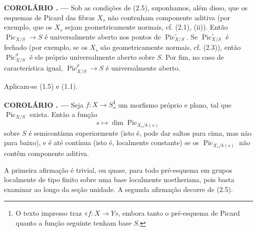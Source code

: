 \documentclass[11pt,twoside,openany]{book}
\numberwithin{equation}{section}
\newcommand{\src}[1]{%
  \phantomsection\hypertarget{src:#1}{}%
  \marginpar{\raggedleft\footnotesize\sffamily #1}%
}
\theoremstyle{plain}
\theoremstyle{definition}
\theoremstyle{remark}
\newcommand{\result}[2]{%
  \par\medskip\noindent\textbf{#1%
  \if\relax\detokenize{#2}\relax\else\space#2\fi. ---}\enspace
}
\newcommand{\FgaUnitKey}{frontmatter}
\renewcommand{\src}[1]{%
  \phantomsection\hypertarget{src:\FgaUnitKey:#1}{}%
  \marginpar{\raggedleft\footnotesize\sffamily #1}%
}
\begin{document}
\result{COROLÁRIO}{} Sob as condições de (2.5), suponhamos, além disso, que os
esquemas de Picard das fibras $X_s$ não contenham componente aditiva (por
exemplo, que os $X_s$ sejam geometricamente normais, cf. (2.1), (ii)). Então
$\operatorname{Pic}_{X/S}\longrightarrow S$ é universalmente aberto nos pontos
de $\operatorname{Pic}_{X/S}^\circ$. Se
$\operatorname{Pic}_{X/S}^\circ$ é fechado (por exemplo, se os $X_s$ são
geometricamente normais, cf. (2.3)), então
$\operatorname{Pic}_{X/S}^\sigma$ é ele próprio universalmente aberto sobre
$S$. Por fim, no caso de característica igual,
$\operatorname{Pic}_{X/S}^\rho\longrightarrow S$ é universalmente aberto.

Aplicam-se (1.5) e (1.1).
\src{234}
\result{COROLÁRIO}{2.7} Seja $f:X\longrightarrow S$\footnote{O texto impresso
traz «$f:X\longrightarrow Y$», embora tanto o pré-esquema de Picard quanto a
função seguinte tenham base $S$.} um morfismo próprio e plano, tal que
$\operatorname{Pic}_{X/S}$ exista. Então a função
\[
s\longmapsto\dim\operatorname{Pic}_{X_s/k(s)}
\]
sobre $S$ é semicontínua superiormente (isto é, pode dar saltos para cima, mas
não para baixo), e é até contínua (isto é, localmente constante) se os
$\operatorname{Pic}_{X_s/k(s)}$ não contêm componente aditiva.

A primeira afirmação é trivial, ou quase, para todo pré-esquema em grupos
localmente de tipo finito sobre uma base localmente noetheriana, pois basta
examinar ao longo da seção unidade. A segunda afirmação decorre de (2.5).
\end{document}
